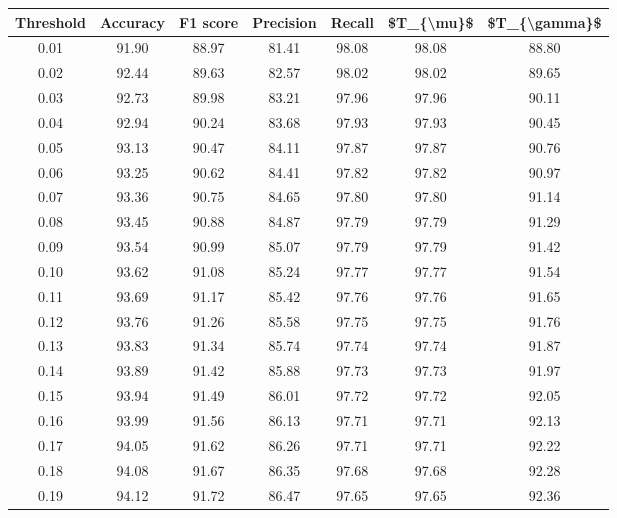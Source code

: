 \begin{tabular}{|c|c|c|c|c|c|c|}
\hline
 Threshold &  Accuracy &  F1 score &  Precision &  Recall &  \$T\_\{\textbackslash mu\}\$ &  \$T\_\{\textbackslash gamma\}\$ \\
\hline
      0.01 &     91.90 &     88.97 &      81.41 &   98.08 &      98.08 &         88.80 \\
      0.02 &     92.44 &     89.63 &      82.57 &   98.02 &      98.02 &         89.65 \\
      0.03 &     92.73 &     89.98 &      83.21 &   97.96 &      97.96 &         90.11 \\
      0.04 &     92.94 &     90.24 &      83.68 &   97.93 &      97.93 &         90.45 \\
      0.05 &     93.13 &     90.47 &      84.11 &   97.87 &      97.87 &         90.76 \\
      0.06 &     93.25 &     90.62 &      84.41 &   97.82 &      97.82 &         90.97 \\
      0.07 &     93.36 &     90.75 &      84.65 &   97.80 &      97.80 &         91.14 \\
      0.08 &     93.45 &     90.88 &      84.87 &   97.79 &      97.79 &         91.29 \\
      0.09 &     93.54 &     90.99 &      85.07 &   97.79 &      97.79 &         91.42 \\
      0.10 &     93.62 &     91.08 &      85.24 &   97.77 &      97.77 &         91.54 \\
      0.11 &     93.69 &     91.17 &      85.42 &   97.76 &      97.76 &         91.65 \\
      0.12 &     93.76 &     91.26 &      85.58 &   97.75 &      97.75 &         91.76 \\
      0.13 &     93.83 &     91.34 &      85.74 &   97.74 &      97.74 &         91.87 \\
      0.14 &     93.89 &     91.42 &      85.88 &   97.73 &      97.73 &         91.97 \\
      0.15 &     93.94 &     91.49 &      86.01 &   97.72 &      97.72 &         92.05 \\
      0.16 &     93.99 &     91.56 &      86.13 &   97.71 &      97.71 &         92.13 \\
      0.17 &     94.05 &     91.62 &      86.26 &   97.71 &      97.71 &         92.22 \\
      0.18 &     94.08 &     91.67 &      86.35 &   97.68 &      97.68 &         92.28 \\
      0.19 &     94.12 &     91.72 &      86.47 &   97.65 &      97.65 &         92.36 \\

\end{tabular}
